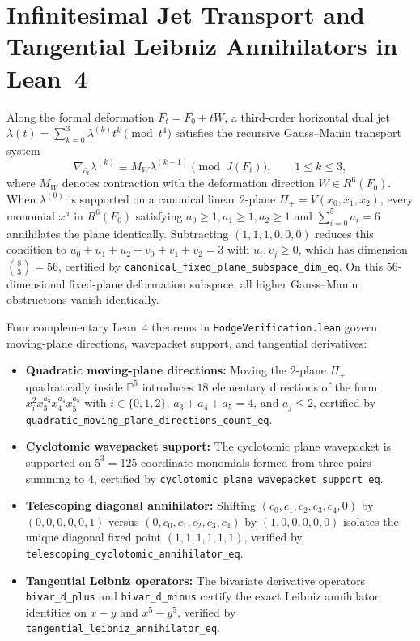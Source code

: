 \documentclass[11pt,a4paper]{article}
\begin{document}
\section{Infinitesimal Jet Transport and Tangential Leibniz Annihilators in Lean~4}

Along the formal deformation $F_t = F_0 + t W$, a third-order horizontal dual jet $\lambda(t) = \sum_{k=0}^3 \lambda^{(k)} t^k \pmod{t^4}$ satisfies the recursive Gauss--Manin transport system
\begin{equation}
  \nabla_{\partial_t} \lambda^{(k)} \equiv M_W \lambda^{(k-1)} \pmod{J(F_t)}, \qquad 1 \le k \le 3,
\end{equation}
where $M_W$ denotes contraction with the deformation direction $W \in R^6(F_0)$. When $\lambda^{(0)}$ is supported on a canonical linear $2$-plane $\Pi_+ = V(x_0, x_1, x_2)$, every monomial $x^a$ in $R^6(F_0)$ satisfying $a_0 \ge 1, a_1 \ge 1, a_2 \ge 1$ and $\sum_{i=0}^5 a_i = 6$ annihilates the plane identically. Subtracting $(1,1,1,0,0,0)$ reduces this condition to $u_0 + u_1 + u_2 + v_0 + v_1 + v_2 = 3$ with $u_i, v_j \ge 0$, which has dimension $\binom{8}{3} = 56$, certified by \texttt{canonical\_fixed\_plane\_subspace\_dim\_eq}. On this $56$-dimensional fixed-plane deformation subspace, all higher Gauss--Manin obstructions vanish identically.

Four complementary Lean~4 theorems in \texttt{HodgeVerification.lean} govern moving-plane directions, wavepacket support, and tangential derivatives:
\begin{itemize}
  \item \textbf{Quadratic moving-plane directions:} Moving the $2$-plane $\Pi_+$ quadratically inside $\mathbb{P}^5$ introduces $18$ elementary directions of the form $x_i^2 x_3^{a_3} x_4^{a_4} x_5^{a_5}$ with $i \in \{0,1,2\}$, $a_3 + a_4 + a_5 = 4$, and $a_j \le 2$, certified by \texttt{quadratic\_moving\_plane\_directions\_count\_eq}.
  \item \textbf{Cyclotomic wavepacket support:} The cyclotomic plane wavepacket is supported on $5^3 = 125$ coordinate monomials formed from three pairs summing to $4$, certified by \texttt{cyclotomic\_plane\_wavepacket\_support\_eq}.
  \item \textbf{Telescoping diagonal annihilator:} Shifting $(c_0,c_1,c_2,c_3,c_4,0)$ by $(0,0,0,0,0,1)$ versus $(0,c_0,c_1,c_2,c_3,c_4)$ by $(1,0,0,0,0,0)$ isolates the unique diagonal fixed point $(1,1,1,1,1,1)$, verified by \texttt{telescoping\_cyclotomic\_annihilator\_eq}.
  \item \textbf{Tangential Leibniz operators:} The bivariate derivative operators \texttt{bivar\_d\_plus} and \texttt{bivar\_d\_minus} certify the exact Leibniz annihilator identities on $x - y$ and $x^5 - y^5$, verified by \texttt{tangential\_leibniz\_annihilator\_eq}.
\end{itemize}
\end{document}
